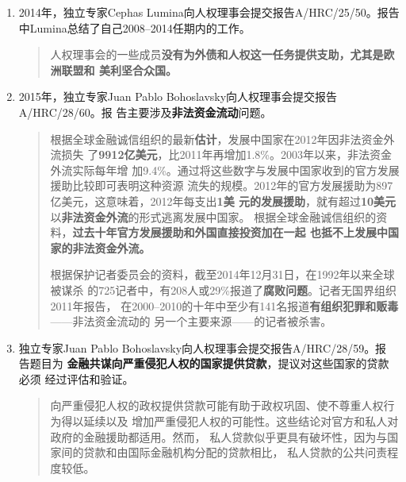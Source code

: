 \begin{enumerate}
\item 2014年，独立专家Cephas Lumina向人权理事会提交报告A/HRC/25/50。报告
  中Lumina总结了自己2008--2014任期内的工作。
  \begin{quotation}
    人权理事会的一些成员\textbf{没有为外债和人权这一任务提供支助，尤其是欧洲联盟和
      美利坚合众国。}
  \end{quotation}


\item 2015年，独立专家Juan Pablo Bohoslavsky向人权理事会提交报告A/HRC/28/60。报
  告主要涉及\textbf{非法资金流动}问题。
  \begin{quotation}
    根据全球金融诚信组织的最新\textbf{估计}，发展中国家在2012年因非法资金外流损失
    了\textbf{9912亿美元}，比2011年再增加1.8\%。2003年以来，非法资金外流实际每年增
    加9.4\%。通过将这些数字与发展中国家收到的官方发展援助比较即可表明这种资源
    流失的规模。2012年的官方发展援助为897亿美元，这意味着，2012年每支出\textbf{1美
      元的发展援助}，就有超过\textbf{10美元}以\textbf{非法资金外流}的形式逃离发展中国家。
    根据全球金融诚信组织的资料，\textbf{过去十年官方发展援助和外国直接投资加在一起
      也抵不上发展中国家的非法资金外流。}

    根据保护记者委员会的资料，截至2014年12月31日，在1992年以来全球被谋杀
    的725记者中，有208人或29\%报道了\textbf{腐败问题}。记者无国界组织2011年报告，
    在2000--2010的十年中至少有141名报道\textbf{有组织犯罪和贩毒}——非法资金流动的
    另一个主要来源——的记者被杀害。
  \end{quotation}

\item 独立专家Juan Pablo Bohoslavsky向人权理事会提交报告A/HRC/28/59。报
  告题目为 \textbf{金融共谋向严重侵犯人权的国家提供贷款}，提议对这些国家的贷款必须
  经过评估和验证。
  \begin{quotation}
    向严重侵犯人权的政权提供贷款可能有助于政权巩固、使不尊重人权行为得以延续以及
    增加严重侵犯人权的可能性。这些结论对官方和私人对政府的金融援助都适用。然而，
    私人贷款似乎更具有破坏性，因为与国家间的贷款和由国际金融机构分配的贷款相比，
    私人贷款的公共问责程度较低。
  \end{quotation}


\end{enumerate}



